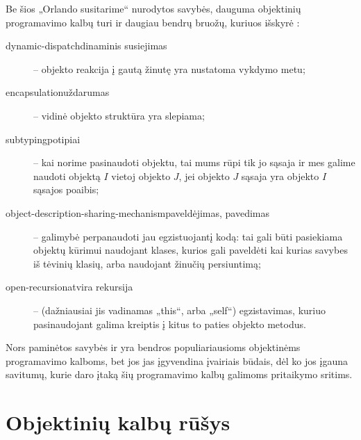 Be šios „Orlando susitarime“ nurodytos savybės, dauguma
objektinių programavimo kalbų turi ir daugiau bendrų bruožų,
kuriuos išskyrė \cite[225-227]{types-and-programming-languages}:
\begin{description}
  \item[\gls{dynamic-dispatch}{dinaminis susiejimas}] –
    objekto reakcija į gautą žinutę yra nustatoma vykdymo metu;
  \item[\gls{encapsulation}{uždarumas}] – vidinė objekto
    struktūra yra slepiama;
  \item[\gls{subtyping}{potipiai}] – kai norime pasinaudoti objektu, 
    tai mums rūpi tik jo sąsaja ir mes galime naudoti objektą $I$ vietoj
    objekto $J$, jei objekto $J$ sąsaja yra objekto $I$ sąsajos poaibis;
  \item[\gls{object-description-sharing-mechanism}{paveldėjimas,
    pavedimas}] – galimybė perpanaudoti jau egzistuojantį kodą: tai
    gali būti pasiekiama objektų kūrimui naudojant klases, kurios
    gali paveldėti kai kurias savybes iš tėvinių klasių, arba
    naudojant žinučių persiuntimą;
  \item[\gls{open-recursion}{atvira rekursija}] –
    (dažniausiai jis vadinamas „this“, arba „self“)
    egzistavimas, kuriuo pasinaudojant galima kreiptis į kitus to
    paties objekto metodus.
\end{description}
Nors paminėtos savybės ir yra bendros populiariausioms objektinėms
programavimo kalboms, bet jos jas
 įgyvendina įvairiais būdais, dėl ko jos įgauna
savitumų, kurie daro įtaką šių programavimo kalbų galimoms
pritaikymo sritims.

\section{Objektinių kalbų rūšys}

